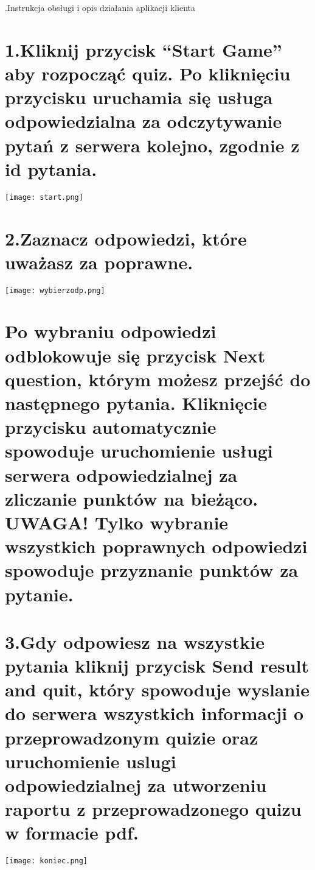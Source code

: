 \documentclass[a4paper]{article}
\newcounter{para}
\newcommand\mypara{\par \refstepcounter {para} \huge \textbf \thepara.\space}\usepackage[T1]{fontenc}
\begin{document}
\mypara Instrukcja obsługi i opis działania aplikacji klienta
\section*{\large\hspace*{8mm} 1.Kliknij przycisk “Start Game” aby rozpocząć quiz.
Po kliknięciu przycisku uruchamia się usługa odpowiedzialna za odczytywanie pytań z serwera kolejno, zgodnie z id pytania.}\par


\begin{center}
\texttt{[image: start.png]}
\end{center}
\newpage %

\section*{\large\hspace*{8mm} 2.Zaznacz odpowiedzi, które uważasz za poprawne.}\par
\begin{center}
\texttt{[image: wybierzodp.png]}
\end{center}
\section*{\large\hspace*{8mm} Po wybraniu odpowiedzi odblokowuje się przycisk Next question, którym możesz przejść do następnego pytania. Kliknięcie przycisku automatycznie spowoduje uruchomienie usługi serwera odpowiedzialnej za zliczanie punktów na bieżąco.
UWAGA! Tylko wybranie wszystkich poprawnych odpowiedzi spowoduje przyznanie punktów za pytanie.}\par
\section*{\large\hspace*{8mm} 3.Gdy odpowiesz na wszystkie pytania kliknij przycisk Send result and quit, który spowoduje wyslanie do serwera wszystkich informacji o przeprowadzonym quizie oraz uruchomienie uslugi odpowiedzialnej za utworzeniu raportu z przeprowadzonego quizu w formacie pdf.}\par
\begin{center}
\texttt{[image: koniec.png]}
\end{center}
\end{document}

